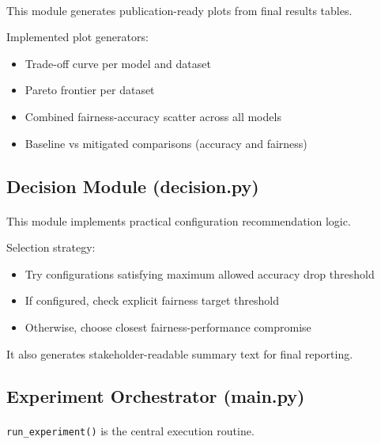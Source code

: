 \paragraph{}

This module generates publication-ready plots from final results tables.

Implemented plot generators:
\begin{itemize}
    \item Trade-off curve per model and dataset
    \item Pareto frontier per dataset
    \item Combined fairness-accuracy scatter across all models
    \item Baseline vs mitigated comparisons (accuracy and fairness)
\end{itemize}

\subsection{Decision Module (decision.py)}
\paragraph{}

This module implements practical configuration recommendation logic.

Selection strategy:
\begin{itemize}
    \item Try configurations satisfying maximum allowed accuracy drop threshold
    \item If configured, check explicit fairness target threshold
    \item Otherwise, choose closest fairness-performance compromise
\end{itemize}

It also generates stakeholder-readable summary text for final reporting.

\subsection{Experiment Orchestrator (main.py)}
\paragraph{}

\texttt{run\_experiment()} is the central execution routine.

